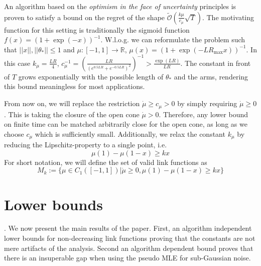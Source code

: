 \documentclass[twoside]{article} \usepackage{aistats2017}
\begin{document}
An algorithm based on the \textit{optimism in the face of uncertainty} principles is proven to satisfy a bound on the regret of the shape $\tilde{\mathcal{O}}(\frac{k\mu}{c_\mu}\sqrt{T})$. 
The motivating function for this setting is traditionally the sigmoid function $f(x) = (1+\exp(-x))^{-1}$.
W.l.o.g. we can reformulate the problem such that $||x||,||\theta_*||\leq 1$ and $\mu:[-1,1]\rightarrow\mathbb{R}$,
$\mu(x) = (1+\exp(-LR_{\max}x))^{-1}$.
In this case $k_\mu = \frac{LR}{4}$, $c_\mu^{-1} = \left(\frac{LR}{(e^{0.5LR}+e^{-0.5LR})^2}\right)^{-1} > \frac{\exp(LR)}{LR}$. The constant in front of $T$ grows exponentially with the possible length of $\theta_*$ and the arms, rendering this bound meaningless for most applications.

From now on, we will replace the restriction $\dot{\mu}\geq c_\mu >0$ by simply requiring $\dot{\mu}\geq0$. This is taking the closure of the open cone $\dot{\mu}>0$. Therefore, any lower bound on finite time can be matched arbitrarily close for the open cone, as long as we choose $c_\mu$ which is sufficiently small.
Additionally, we relax the constant $k_\mu$ by reducing the Lipschitz-property to a single point, i.e.
$$\mu(1)-\mu(1-x)\geq kx$$
For short notation, we will define the set of valid link functions as
$$M_k := \{\mu \in C_1([-1,1]) | \dot{\mu}\geq 0, \mu(1)-\mu(1-x)\geq kx\}$$

\section{Lower bounds}\label{lowerBounds}
.
We now present the main results of the paper. 
First, an algorithm independent lower bounds for non-decreasing link functions proving that the constants are not mere artifacts of the analysis. 
Second an algorithm dependent bound proves that there is an insuperable gap when using the pseudo MLE for sub-Gaussian noise.
\end{document}

